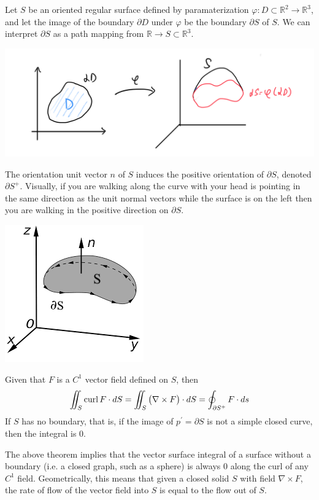   \begin{theorem}
  Let $S$ be an oriented regular surface defined by paramaterization $\varphi: D \subset \mathbb{R}^2 \longrightarrow \mathbb{R}^3$, and let the image of the boundary $\partial D$ under $\varphi$ be the boundary $\partial S$ of $S$. We can interpret $\partial S$ as a path mapping from $\mathbb{R} \longrightarrow S \subset \mathbb{R}^3$. 
  \begin{center}
    \includegraphics[scale=0.27]{img/Boundary_Mapping.PNG}
  \end{center}
  The orientation unit vector $n$ of $S$ induces the positive orientation of $\partial S$, denoted $\partial S^+$. Visually, if you are walking along the curve with your head is pointing in the same direction as the unit normal vectors while the surface is on the left then you are walking in the positive direction on $\partial S$. 
  \begin{center}
      \includegraphics[scale=0.8]{img/Stokes_Theorem_Orientation.png}
  \end{center}
  Given that $F$ is a $C^1$ vector field defined on $S$, then
  \[\iint_S \curl{F} \cdot dS = \iint_S \big( \nabla \times F \big) \cdot d S = \oint_{\partial S^+} F \cdot d s\]
  If $S$ has no boundary, that is, if the image of $p^\prime = \partial S$ is not a simple closed curve, then the integral is $0$. 
  \end{theorem}

  The above theorem implies that the vector surface integral of a surface without a boundary (i.e. a closed graph, such as a sphere) is always $0$ along the curl of any $C^1$ field. Geometrically, this means that given a closed solid $S$ with field $\nabla \times F$, the rate of flow of the vector field into $S$ is equal to the flow out of $S$. 

